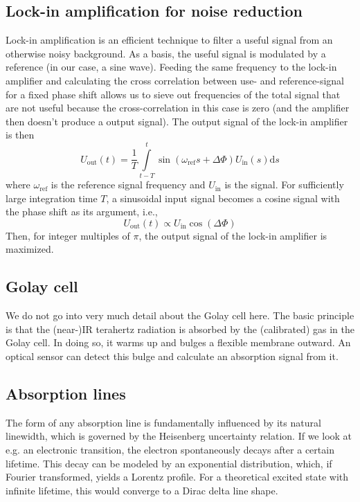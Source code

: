 \documentclass[a4paper,10pt]{scrartcl}
\newcommand*{\dif}{\mathrm{d}}
\begin{document}
\subsection{Lock-in amplification for noise reduction}

Lock-in amplification is an efficient technique to filter a useful signal from an otherwise noisy background. As a basis, the useful signal is modulated by a reference (in our case, a sine wave). Feeding the same frequency to the lock-in amplifier and calculating the cross correlation between use- and reference-signal for a fixed phase shift allows us to sieve out frequencies of the total signal that are not useful because the cross-correlation in this case is zero (and the amplifier then doesn't produce a output signal).
The output signal of the lock-in amplifier is then
\begin{equation}
U_\mathrm{out} (t) = \frac{1}{T} \int\limits_{t-T}^t \sin (\omega_\mathrm{ref} s + \Delta \Phi) U_\mathrm{in}(s) \dif s
\end{equation}
where $\omega_\mathrm{ref}$ is the reference signal frequency \cite{thinksrs} and $U_\mathrm{in}$ is the signal. For sufficiently large integration time $T$, a sinusoidal input signal becomes a cosine signal with the phase shift as its argument, i.e.,
\begin{equation}
U_\mathrm{out} (t) \propto U_\mathrm{in} \cos (\Delta \Phi)
\end{equation}
Then, for integer multiples of $\pi$, the output signal of the lock-in amplifier is maximized.

\subsection{Golay cell}

We do not go into very much detail about the Golay cell here. The basic principle is that the (near-)IR terahertz radiation is absorbed by the (calibrated) gas in the Golay cell. In doing so, it warms up and bulges a flexible membrane outward. An optical sensor can detect this bulge and calculate an absorption signal from it.

\subsection{Absorption lines}

The form of any absorption line is fundamentally influenced by its natural linewidth, which is governed by the Heisenberg uncertainty relation. If we look at e.g. an electronic transition, the electron spontaneously decays after a certain lifetime. This decay can be modeled by an exponential distribution, which, if Fourier transformed, yields a Lorentz profile. For a theoretical excited state with infinite lifetime, this would converge to a Dirac delta line shape.
\end{document}
